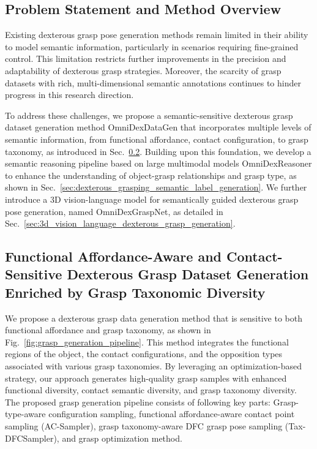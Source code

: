 

\subsection{Problem Statement and Method Overview}
Existing dexterous grasp pose generation methods remain limited in their ability to model semantic information, particularly in scenarios requiring fine-grained control. This limitation restricts further improvements in the precision and adaptability of dexterous grasp strategies. Moreover, the scarcity of grasp datasets with rich, multi-dimensional semantic annotations continues to hinder progress in this research direction.

To address these challenges, we propose a semantic-sensitive dexterous grasp dataset generation method OmniDexDataGen that incorporates multiple levels of semantic information, from functional affordance, contact configuration, to grasp taxonomy,  as introduced in Sec.~\ref{sec:dataset_generation_grasp_taxonomy_aware}. Building upon this foundation, we develop a semantic reasoning pipeline based on large multimodal models OmniDexReasoner to enhance the understanding of object-grasp relationships and grasp type, as shown in Sec.~\ref{sec:dexterous_grasping_semantic_label_generation}. We further introduce a 3D vision-language model for semantically guided dexterous grasp pose generation, named OmniDexGraspNet, as detailed in Sec.~\ref{sec:3d_vision_language_dexterous_grasp_generation}. 


\subsection{Functional Affordance-Aware and Contact-Sensitive Dexterous Grasp Dataset Generation Enriched by Grasp Taxonomic Diversity}
\label{sec:dataset_generation_grasp_taxonomy_aware}
We propose a dexterous grasp data generation method that is sensitive to both functional affordance and grasp taxonomy, as shown in Fig.~\ref{fig:grasp_generation_pipeline}. This method integrates the functional regions of the object, the contact configurations, and the opposition types associated with various grasp taxonomies. By leveraging an optimization-based strategy, our approach generates high-quality grasp samples with enhanced functional diversity, contact semantic diversity, and grasp taxonomy diversity. The proposed grasp generation pipeline consists of following key parts: Grasp-type-aware configuration sampling, functional affordance-aware contact point sampling (AC-Sampler), grasp taxonomy-aware DFC grasp pose sampling (Tax-DFCSampler), and grasp optimization method.

